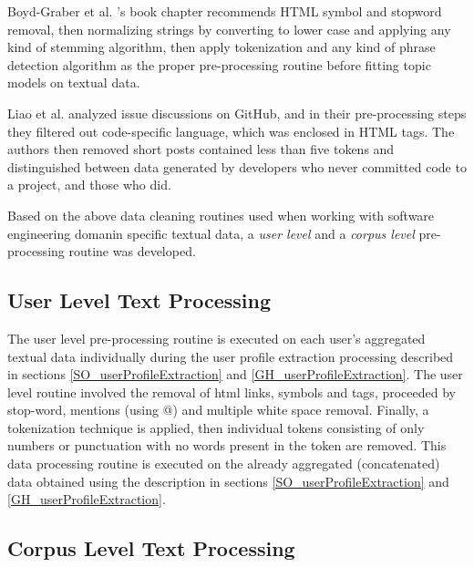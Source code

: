     Boyd-Graber et al. \cite{boyd2014care}'s book chapter recommends HTML symbol and  stopword removal, then normalizing strings by converting to lower case and applying any kind of stemming algorithm, then apply tokenization and any kind of phrase detection algorithm as the proper pre-processing routine before fitting topic models on textual data.
    
    Liao et al. \cite{liao2019status} analyzed issue discussions on GitHub, and in their pre-processing steps they filtered out code-specific language, which was enclosed in HTML tags. The authors then removed short posts contained less than five tokens and distinguished between data generated by developers who never committed code to a project, and those who did. 
    
    Based on the above data cleaning routines used when working with software engineering domanin specific textual data, a \emph{user level} and a \emph{corpus level} pre-processing routine was developed. 
    
    \subsection{User Level Text Processing}
    
        The user level pre-processing routine is executed on each user's aggregated textual data individually during the user profile extraction processing described in sections \ref{SO_userProfileExtraction} and \ref{GH_userProfileExtraction}. The user level routine involved the removal of html links, symbols and tags, proceeded by stop-word, mentions (using @) and multiple white space removal. Finally, a tokenization technique is applied, then individual tokens consisting of only numbers or punctuation with no words present in the token are removed. This data processing routine is executed on the already aggregated (concatenated) data obtained using the description in sections \ref{SO_userProfileExtraction} and \ref{GH_userProfileExtraction}.
        
    \subsection{Corpus Level Text Processing}
    
